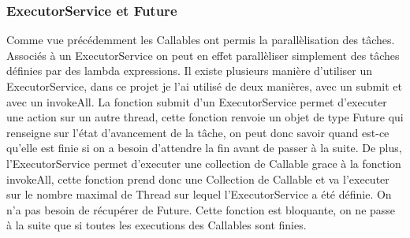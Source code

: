 \subsubsection{ExecutorService et Future}

Comme vue précédemment les Callables ont permis la parallèlisation des tâches. Associés à un ExecutorService on peut en effet parallèliser simplement des tâches définies par des lambda expressions.
\ml
Il existe plusieurs manière d'utiliser un ExecutorService, dans ce projet je l'ai utilisé de deux manières, avec un submit et avec un invokeAll.
\ml
La fonction submit d'un ExecutorService permet d'executer une action sur un autre thread, cette fonction renvoie un objet de type Future qui renseigne sur l'état d'avancement de la tâche, on peut donc savoir quand est-ce qu'elle est finie si on a besoin d'attendre la fin avant de passer à la suite.
\ml
De plus, l'ExecutorService permet d'executer une collection de Callable grace à la fonction invokeAll, cette fonction prend donc une Collection de Callable et va l'executer sur le nombre maximal de Thread sur lequel l'ExecutorService a été définie. On n'a pas besoin de récupérer de Future. Cette fonction est bloquante, on ne passe à la suite que si toutes les executions des Callables sont finies.
